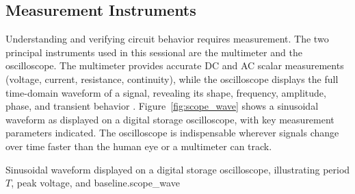 \subsection*{Measurement Instruments}

Understanding and verifying circuit behavior requires measurement. The two principal
instruments used in this sessional are the multimeter and the
oscilloscope. The multimeter provides accurate DC and AC scalar measurements
(voltage, current, resistance, continuity), while the oscilloscope displays the full
time-domain waveform of a signal, revealing its shape, frequency, amplitude, phase, and
transient behavior \cite{wiki:oscilloscope}. Figure~\ref{fig:scope_wave} shows a
sinusoidal waveform as displayed on a digital storage oscilloscope, with key measurement
parameters indicated. The oscilloscope is indispensable wherever signals change over time
faster than the human eye or a multimeter can track.

%
  {Sinusoidal waveform displayed on a digital storage oscilloscope,
   illustrating period $T$, peak voltage, and baseline.}{scope_wave}

